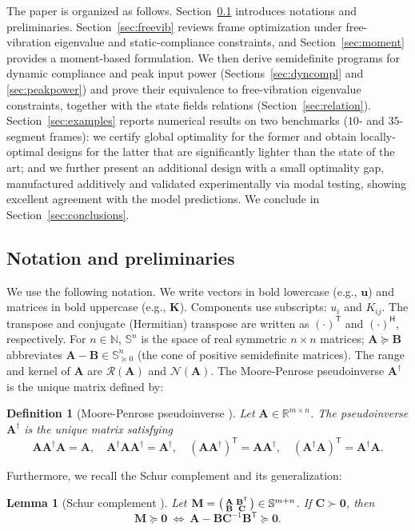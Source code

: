 \documentclass[preprint,3p]{elsarticle}
\newtheorem{lemma}{Lemma}
\newtheorem{definition}{Definition}
\newcommand{\T}{^{\mathsf T}}
\newcommand{\TC}{^{\mathsf H}}
\newcommand{\range}[1]{\ensuremath{\mathcal{R}\!\left(#1\right)}}
\newcommand{\kernel}[1]{\ensuremath{\mathcal{N}\!\left(#1\right)}}
\numberwithin{equation}{section}
\begin{document}
The paper is organized as follows. Section~\ref{sec:prelim} introduces notations and preliminaries. Section~\ref{sec:freevib} reviews frame optimization under free-vibration eigenvalue and static-compliance constraints, and Section~\ref{sec:moment} provides a moment-based formulation. We then derive semidefinite programs for dynamic compliance and peak input power (Sections~\ref{sec:dyncompl} and \ref{sec:peakpower}) and prove their equivalence to free-vibration eigenvalue constraints, together with the state fields relations (Section~\ref{sec:relation}). Section~\ref{sec:examples} reports numerical results on two benchmarks ($10$- and $35$-segment frames): we certify global optimality for the former and obtain locally-optimal designs for the latter that are significantly lighter than the state of the art; and we further present an additional design with a small optimality gap, manufactured additively and validated experimentally via modal testing, showing excellent agreement with the model predictions. We conclude in Section~\ref{sec:conclusions}.

\subsection{Notation and preliminaries}\label{sec:prelim}

We use the following notation. We write vectors in bold lowercase (e.g., $\mathbf{u}$) and matrices in bold uppercase (e.g., $\mathbf{K}$). Components use subscripts: $u_i$ and $K_{ij}$. The transpose and conjugate (Hermitian) transpose are written as $(\cdot)\T$ and $(\cdot)\TC$, respectively. For $n\in\mathbb{N}$, $\mathbb{S}^n$ is the space of real symmetric $n\times n$ matrices; $\mathbf{A}\succeq\mathbf{B}$ abbreviates $\mathbf{A}-\mathbf{B}\in\mathbb{S}^n_{\succeq 0}$ (the cone of positive semidefinite matrices). The range and kernel of $\mathbf{A}$ are $\range{\mathbf{A}}$ and $\kernel{\mathbf{A}}$. The Moore-Penrose pseudoinverse $\mathbf{A}^\dagger$ is the unique matrix defined by:

\begin{definition}[Moore-Penrose pseudoinverse \textup{\citep{Boyd2004}}]\label{def:pseudo-inverse}
Let $\mathbf{A}\in\mathbb{R}^{m\times n}$. The pseudoinverse $\mathbf{A}^\dagger$ is the unique matrix satisfying
%
$$
\mathbf{A}\mathbf{A}^\dagger\mathbf{A}=\mathbf{A},\quad
\mathbf{A}^\dagger\mathbf{A}\mathbf{A}^\dagger=\mathbf{A}^\dagger,\quad
(\mathbf{A}\mathbf{A}^\dagger)\T=\mathbf{A}\mathbf{A}^\dagger,\quad
(\mathbf{A}^\dagger\mathbf{A})\T=\mathbf{A}^\dagger\mathbf{A}.
$$
\end{definition}
%
Furthermore, we recall the Schur complement and its generalization:
%
\begin{lemma}[Schur complement \textup{\citep[Theorem~1.12]{Horn2005}}]\label{lem:schur_complement}
Let $\mathbf{M}=\begin{psmallmatrix}\mathbf{A}&\mathbf{B}\T\\ \mathbf{B}&\mathbf{C}\end{psmallmatrix}\in\mathbb{S}^{m+n}$. If $\mathbf{C}\succ\mathbf{0}$, then
%
$$
\mathbf{M}\succeq\mathbf{0}\ \Longleftrightarrow\ \mathbf{A}-\mathbf{B}\mathbf{C}^{-1}\mathbf{B}\T\succeq\mathbf{0}.
$$
\end{lemma}
\end{document}
